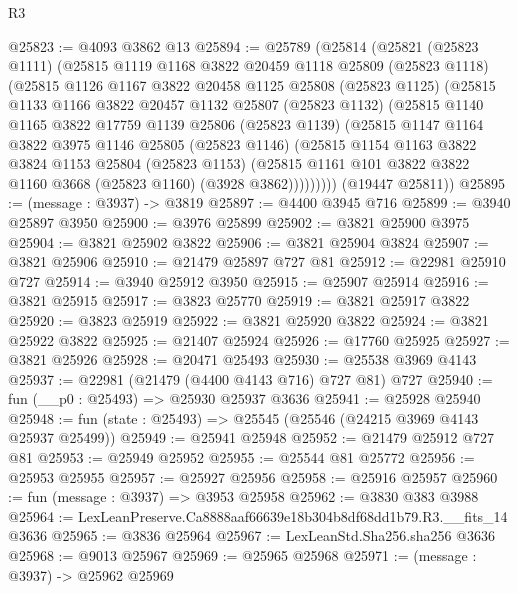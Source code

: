 \begin{lexlean}{R3}
\begin{coremodule}
@25823 := @4093 @3862 @13
@25894 := @25789
    (@25814
      (@25821
        (@25823 @1111)
        (@25815
          @1119
          @1168
          @3822
          @20459
          @1118
          @25809
          (@25823 @1118)
          (@25815
            @1126
            @1167
            @3822
            @20458
            @1125
            @25808
            (@25823 @1125)
            (@25815
              @1133
              @1166
              @3822
              @20457
              @1132
              @25807
              (@25823 @1132)
              (@25815
                @1140
                @1165
                @3822
                @17759
                @1139
                @25806
                (@25823 @1139)
                (@25815
                  @1147
                  @1164
                  @3822
                  @3975
                  @1146
                  @25805
                  (@25823 @1146)
                  (@25815
                    @1154
                    @1163
                    @3822
                    @3824
                    @1153
                    @25804
                    (@25823 @1153)
                    (@25815 @1161 @101 @3822 @3822 @1160 @3668 (@25823 @1160) (@3928 @3862)))))))))
      (@19447 @25811))
@25895 := (message : @3937) -> @3819
@25897 := @4400 @3945 @716
@25899 := @3940 @25897 @3950
@25900 := @3976 @25899
@25902 := @3821 @25900 @3975
@25904 := @3821 @25902 @3822
@25906 := @3821 @25904 @3824
@25907 := @3821 @25906
@25910 := @21479 @25897 @727 @81
@25912 := @22981 @25910 @727
@25914 := @3940 @25912 @3950
@25915 := @25907 @25914
@25916 := @3821 @25915
@25917 := @3823 @25770
@25919 := @3821 @25917 @3822
@25920 := @3823 @25919
@25922 := @3821 @25920 @3822
@25924 := @3821 @25922 @3822
@25925 := @21407 @25924
@25926 := @17760 @25925
@25927 := @3821 @25926
@25928 := @20471 @25493
@25930 := @25538 @3969 @4143
@25937 := @22981 (@21479 (@4400 @4143 @716) @727 @81) @727
@25940 := fun (__p0 : @25493) => @25930 @25937 @3636
@25941 := @25928 @25940
@25948 := fun (state : @25493) => @25545 (@25546 (@24215 @3969 @4143 @25937 @25499))
@25949 := @25941 @25948
@25952 := @21479 @25912 @727 @81
@25953 := @25949 @25952
@25955 := @25544 @81 @25772
@25956 := @25953 @25955
@25957 := @25927 @25956
@25958 := @25916 @25957
@25960 := fun (message : @3937) => @3953 @25958
@25962 := @3830 @383 @3988
@25964 := LexLeanPreserve.Ca8888aaf66639e18b304b8df68dd1b79.R3.__fits_14 @3636
@25965 := @3836 @25964
@25967 := LexLeanStd.Sha256.sha256 @3636
@25968 := @9013 @25967
@25969 := @25965 @25968
@25971 := (message : @3937) -> @25962 @25969

\end{coremodule}
\end{lexlean}
